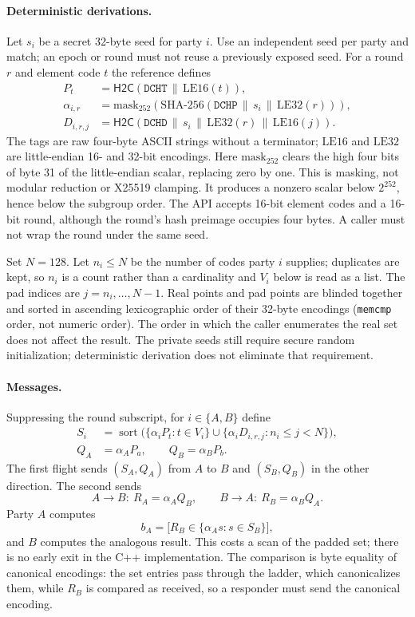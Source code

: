 \documentclass[11pt]{article}
\newcommand{\HtoC}{\mathsf{H2C}}
\newcommand{\sha}{\mathrm{SHA\text{-}256}}
\newcommand{\concat}{\,\|\,}
\begin{document}
\paragraph{Deterministic derivations.}
Let $s_i$ be a secret 32-byte seed for party $i$. Use an independent seed per
party and match; an epoch or round must not reuse a previously exposed seed.
For a round $r$ and element code $t$ the reference defines
\begin{align*}
 P_t &= \HtoC(\mathtt{DCHT}\concat\mathrm{LE16}(t)),\\
 \alpha_{i,r} &= \mathrm{mask}_{252}
     (\sha(\mathtt{DCHP}\concat s_i\concat\mathrm{LE32}(r))),\\
 D_{i,r,j} &= \HtoC(\mathtt{DCHD}\concat s_i\concat
                          \mathrm{LE32}(r)\concat\mathrm{LE16}(j)).
\end{align*}
The tags are raw four-byte ASCII strings without a terminator; $\mathrm{LE16}$
and $\mathrm{LE32}$ are little-endian 16- and 32-bit encodings.
Here $\mathrm{mask}_{252}$ clears the high four bits of byte 31 of the
little-endian scalar, replacing zero by one. This is masking, not modular
reduction or X25519 clamping. It produces a nonzero scalar below $2^{252}$,
hence below the subgroup order. The API accepts 16-bit element codes and a
16-bit round, although the round's hash preimage occupies four bytes. A caller
must not wrap the round under the same seed.

Set $N=128$. Let $n_i\leq N$ be the number of codes party $i$ supplies;
duplicates are kept, so $n_i$ is a count rather than a cardinality and
$V_i$ below is read as a list. The pad indices are $j=n_i,\ldots,N-1$. Real
points and pad points are blinded together and sorted in ascending
lexicographic order of their 32-byte encodings (\texttt{memcmp} order, not
numeric order). The order
in which the caller enumerates the real set does not affect the result. The private seeds still require secure random
initialization; deterministic derivation does not eliminate that requirement.

\paragraph{Messages.}
Suppressing the round subscript, for $i\in\{A,B\}$ define
\begin{align*}
 S_i&=\operatorname{sort}\bigl(
       \{\alpha_i P_t:t\in V_i\}\cup
       \{\alpha_i D_{i,r,j}:n_i\leq j<N\}\bigr),\\
 Q_A&=\alpha_A P_a,\qquad Q_B=\alpha_B P_b.
\end{align*}
The first flight sends $(S_A,Q_A)$ from $A$ to $B$ and $(S_B,Q_B)$ in the
other direction. The second sends
\[
 A\longrightarrow B:\ R_A=\alpha_A Q_B,
 \qquad B\longrightarrow A:\ R_B=\alpha_B Q_A.
\]
Party $A$ computes
\[
 b_A=\bigl[R_B\in\{\alpha_A s:s\in S_B\}\bigr],
\]
and $B$ computes the analogous result. This costs a scan of the padded set;
there is no early exit in the C++ implementation. The comparison is byte
equality of canonical encodings: the set entries pass through the ladder,
which canonicalizes them, while $R_B$ is compared as received, so a responder
must send the canonical encoding.
\end{document}
